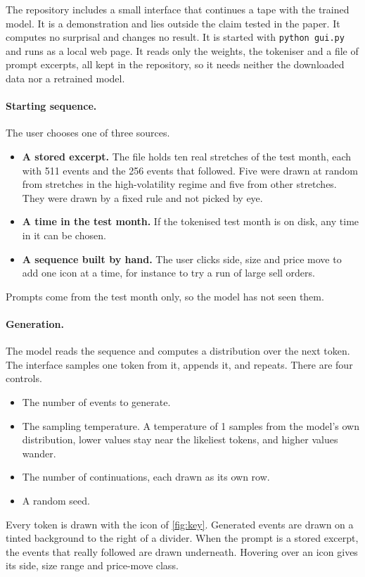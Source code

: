 \documentclass[11pt]{article}
\begin{document}
The repository includes a small interface that continues a tape with the trained model.
It is a demonstration and lies outside the claim tested in the paper.
It computes no surprisal and changes no result.
It is started with \texttt{python gui.py} and runs as a local web page.
It reads only the weights, the tokeniser and a file of prompt excerpts, all kept in the repository, so it needs neither the downloaded data nor a retrained model.

\paragraph{Starting sequence.}
The user chooses one of three sources.
\begin{itemize}
  \item \textbf{A stored excerpt.} The file holds ten real stretches of the test month, each with 511 events and the 256 events that followed. Five were drawn at random from stretches in the high-volatility regime and five from other stretches. They were drawn by a fixed rule and not picked by eye.
  \item \textbf{A time in the test month.} If the tokenised test month is on disk, any time in it can be chosen.
  \item \textbf{A sequence built by hand.} The user clicks side, size and price move to add one icon at a time, for instance to try a run of large sell orders.
\end{itemize}
Prompts come from the test month only, so the model has not seen them.

\paragraph{Generation.}
The model reads the sequence and computes a distribution over the next token.
The interface samples one token from it, appends it, and repeats.
There are four controls.
\begin{itemize}
  \item The number of events to generate.
  \item The sampling temperature. A temperature of 1 samples from the model's own distribution, lower values stay near the likeliest tokens, and higher values wander.
  \item The number of continuations, each drawn as its own row.
  \item A random seed.
\end{itemize}
Every token is drawn with the icon of \cref{fig:key}.
Generated events are drawn on a tinted background to the right of a divider.
When the prompt is a stored excerpt, the events that really followed are drawn underneath.
Hovering over an icon gives its side, size range and price-move class.
\end{document}
